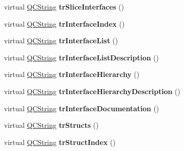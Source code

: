 \begin{DoxyCompactItemize}
virtual \mbox{\hyperlink{class_q_c_string}{Q\+C\+String}} {\bfseries tr\+Slice\+Interfaces} ()
\item 
\mbox{\label{class_translator_adapter__1__8__15_aa07aeca5033a93e8f192785b9959ad99}} 
virtual \mbox{\hyperlink{class_q_c_string}{Q\+C\+String}} {\bfseries tr\+Interface\+Index} ()
\item 
\mbox{\label{class_translator_adapter__1__8__15_a29041277f8e8d1249c632c4de05bf18a}} 
virtual \mbox{\hyperlink{class_q_c_string}{Q\+C\+String}} {\bfseries tr\+Interface\+List} ()
\item 
\mbox{\label{class_translator_adapter__1__8__15_a702d17c9b0650fb39b9cd5a0d8563f0c}} 
virtual \mbox{\hyperlink{class_q_c_string}{Q\+C\+String}} {\bfseries tr\+Interface\+List\+Description} ()
\item 
\mbox{\label{class_translator_adapter__1__8__15_a534c8bf2388f4c7147ecc51b7b860502}} 
virtual \mbox{\hyperlink{class_q_c_string}{Q\+C\+String}} {\bfseries tr\+Interface\+Hierarchy} ()
\item 
\mbox{\label{class_translator_adapter__1__8__15_a507c32affcbac3ecb4e6e71cd99aba19}} 
virtual \mbox{\hyperlink{class_q_c_string}{Q\+C\+String}} {\bfseries tr\+Interface\+Hierarchy\+Description} ()
\item 
\mbox{\label{class_translator_adapter__1__8__15_aff61bb9089d310e44ec260a2f914ed70}} 
virtual \mbox{\hyperlink{class_q_c_string}{Q\+C\+String}} {\bfseries tr\+Interface\+Documentation} ()
\item 
\mbox{\label{class_translator_adapter__1__8__15_a543106f6298883d2e832dfdeb9484e47}} 
virtual \mbox{\hyperlink{class_q_c_string}{Q\+C\+String}} {\bfseries tr\+Structs} ()
\item 
\mbox{\label{class_translator_adapter__1__8__15_a3b672fef4c63a9e01566ce9ac0cde52c}} 
virtual \mbox{\hyperlink{class_q_c_string}{Q\+C\+String}} {\bfseries tr\+Struct\+Index} ()
\item 

\end{DoxyCompactItemize}
